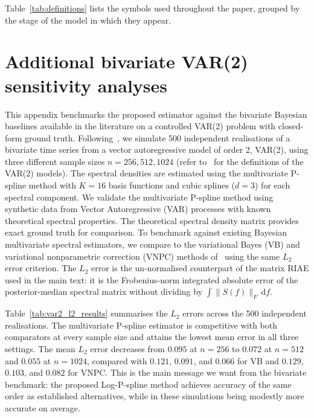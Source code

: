 \documentclass[%
	reprint,
	nofootinbib,
	amsmath,
	amssymb,
	aps,
]{revtex4-2}
\begin{document}
	Table~\ref{tab:definitions} lists the symbols used throughout the
	paper, grouped by the stage of the model in which they appear.

	

	\section{Additional bivariate VAR(2) sensitivity analyses}
	\label{app:var2_appendix}

	This appendix benchmarks the proposed estimator against the bivariate
	Bayesian baselines available in the literature on a controlled VAR(2)
	problem with closed-form ground truth.
	Following~\citet{Liu2023}, we simulate 500 independent realisations of a bivariate
	time series from a vector autoregressive model of order 2, VAR(2), using three different
	sample sizes $n=256,512,1024$ (refer to~\citet[Section~4.2,][]{Liu2023} for the
	definitions of the VAR(2) models). The spectral densities are estimated using
	the multivariate P-spline method with $K=16$ basis functions and cubic splines
	($d=3$) for each spectral component. We validate the multivariate P-spline method
	using synthetic data from Vector Autoregressive (VAR) processes with known theoretical
	spectral properties. The theoretical spectral density matrix provides exact
	ground truth for comparison. To benchmark against existing Bayesian multivariate
	spectral estimators, we compare to the variational Bayes (VB) and variational
	nonparametric correction (VNPC) methods of~\citet{Liu2023} using the same
	$L_{2}$ error criterion. The $L_{2}$ error is the un-normalised
	counterpart of the matrix RIAE used in the main text: it is the
	Frobenius-norm integrated absolute error of the posterior-median
	spectral matrix without dividing by $\int\lVert S(f)\rVert_{F}\,\mathrm{d}f$.

	Table~\ref{tab:var2_l2_results} summarises the $L_{2}$ errors across the 500
	independent realisations. The multivariate P-spline estimator is competitive
	with both comparators at every sample size and attains the lowest mean error in
	all three settings. The mean $L_{2}$ error decreases from $0.095$ at $n=256$ to
	$0.072$ at $n=512$ and $0.055$ at $n=1024$, compared with $0.121$, $0.091$, and
	$0.066$ for VB and $0.129$, $0.103$, and $0.082$ for VNPC. This is the main
	message we want from the bivariate benchmark: the proposed Log-P-spline method
	achieves accuracy of the same order as established alternatives, while in these
	simulations being modestly more accurate on average.
\end{document}
